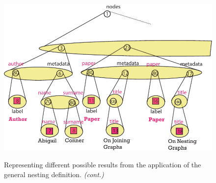 \begin{figure}[!ph]
\begin{minipage}[t]{0.9\textwidth}
	\includegraphics[scale=0.8]{fig/05language/12_intermediate_aggregation.pdf}
	\label{fig:secondexample}
\end{minipage}
\caption{Representing different possible results from the application of the general nesting definition. \textit{(cont.)}}
\label{fig:nestingoperations}
\end{figure}

